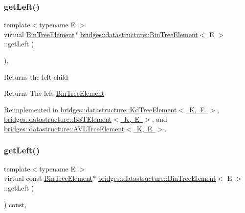 \subsubsection{\texorpdfstring{get\+Left()}{getLeft()}\hspace{0.1cm}{\footnotesize\ttfamily [1/2]}}
{\footnotesize\ttfamily template$<$typename E $>$ \\
virtual \mbox{\hyperlink{classbridges_1_1datastructure_1_1_bin_tree_element}{Bin\+Tree\+Element}}$\ast$ \mbox{\hyperlink{classbridges_1_1datastructure_1_1_bin_tree_element}{bridges\+::datastructure\+::\+Bin\+Tree\+Element}}$<$ E $>$\+::get\+Left (\begin{DoxyParamCaption}{ }\end{DoxyParamCaption})\hspace{0.3cm}{\ttfamily [inline]}, {\ttfamily [virtual]}}

Returns the left child \begin{DoxyReturn}{Returns}
The left \mbox{\hyperlink{classbridges_1_1datastructure_1_1_bin_tree_element}{Bin\+Tree\+Element}} 
\end{DoxyReturn}


Reimplemented in \mbox{\hyperlink{classbridges_1_1datastructure_1_1_kd_tree_element_a875bfa2dfd88a7740f7bcd28a117c12a}{bridges\+::datastructure\+::\+Kd\+Tree\+Element$<$ K, E $>$}}, \mbox{\hyperlink{classbridges_1_1datastructure_1_1_b_s_t_element_af863c624691c11db26ae3b6d723d1f5c}{bridges\+::datastructure\+::\+B\+S\+T\+Element$<$ K, E $>$}}, and \mbox{\hyperlink{classbridges_1_1datastructure_1_1_a_v_l_tree_element_ab05925e343b9fa71b61c71e8034e1293}{bridges\+::datastructure\+::\+A\+V\+L\+Tree\+Element$<$ K, E $>$}}.

\mbox{\label{classbridges_1_1datastructure_1_1_bin_tree_element_ae14a70e2d25ad62337c87059b0cadb48}} 
\subsubsection{\texorpdfstring{get\+Left()}{getLeft()}\hspace{0.1cm}{\footnotesize\ttfamily [2/2]}}
{\footnotesize\ttfamily template$<$typename E $>$ \\
virtual const \mbox{\hyperlink{classbridges_1_1datastructure_1_1_bin_tree_element}{Bin\+Tree\+Element}}$\ast$ \mbox{\hyperlink{classbridges_1_1datastructure_1_1_bin_tree_element}{bridges\+::datastructure\+::\+Bin\+Tree\+Element}}$<$ E $>$\+::get\+Left (\begin{DoxyParamCaption}{ }\end{DoxyParamCaption}) const\hspace{0.3cm}{\ttfamily [inline]}, {\ttfamily [virtual]}}

